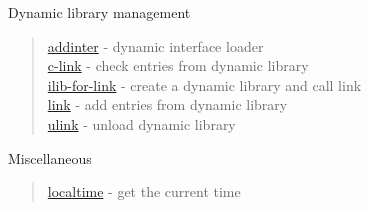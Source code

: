 Dynamic library management
\begin{quote}
\noindent 
\hyperlink{addinter}{addinter} - dynamic interface loader\\
\hyperlink{c_link}{c-link} - check entries from dynamic library \\
\hyperlink{ilib_for_link}{ilib-for-link} - create a dynamic library and call link \\
\hyperlink{link}{link} - add entries from dynamic library \\
\hyperlink{ulink}{ulink} - unload dynamic library \\
\end{quote}

Miscellaneous 
\begin{quote}
\noindent 
\hyperlink{localtime}{localtime} - {get the current time}
\end{quote}




 
  
  

 

 
 

 
 
 
 
